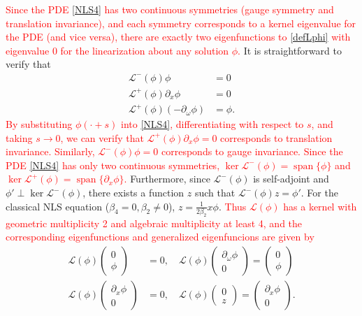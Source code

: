 \documentclass[12pt]{elsarticle}
\def\calL{{\mathcal L}}
\DeclareMathOperator{\spn}{span}
\newcommand{\revised}[1]{ \textcolor{red}{#1} }
\begin{document}
\revised{Since the PDE \cref{NLS4} has two continuous symmetries (gauge symmetry and translation invariance), and each symmetry corresponds to a kernel eigenvalue for the PDE (and vice versa),  there are exactly two eigenfunctions to \cref{defLphi} with eigenvalue 0 for the linearization about any solution $\phi$.} It is straightforward to verify that 
\begin{equation}\label{kerLpmrelations}
\begin{aligned}
\calL^-(\phi) \phi &= 0 \\
\calL^+(\phi) \partial_x \phi &= 0 \\
\calL^+(\phi)(-\partial_\omega \phi) &= \phi.
\end{aligned}
\end{equation}
\revised{By substituting $\phi(\cdot + s)$ into \cref{NLS4}, differentiating with respect to $s$, and taking $s \rightarrow 0$, we can verify that $\calL^+(\phi) \partial_x \phi = 0$ corresponds to translation invariance. Similarly, $\calL^-(\phi) \phi = 0$ corresponds to gauge invariance. Since the PDE \cref{NLS4} has only two continuous symmetries, $\ker \calL^-(\phi) = \spn\{\phi\}$ and $\ker \calL^+(\phi) = \spn\{\partial_x \phi\}$.} Furthermore, since $\calL^-(\phi)$ is self-adjoint and $\phi' \perp \ker \calL^-(\phi)$, there exists a function $z$ such that $\calL^-(\phi) z = \phi'$. For the classical NLS equation ($\beta_4 = 0, \beta_2 \neq 0$), $z = \frac{1}{2 \beta_2} x \phi$. \revised{Thus $\calL(\phi)$ has a kernel with geometric multiplicity 2 and algebraic multiplicity at least 4, and the corresponding eigenfunctions and generalized eigenfuncions are given by}
\begin{equation}\label{Lphikernel}
\begin{aligned}
\calL(\phi)\begin{pmatrix}0 \\ \phi \end{pmatrix} &= 0, \quad
\calL(\phi)\begin{pmatrix} \partial_\omega \phi \\ 0 \end{pmatrix} = \begin{pmatrix}0 \\ \phi \end{pmatrix} \\
\calL(\phi)\begin{pmatrix}\partial_x\phi \\ 0 \end{pmatrix} &= 0, \quad
\calL(\phi)\begin{pmatrix} 0 \\ z \end{pmatrix} = \begin{pmatrix}\partial_x\phi \\ 0 \end{pmatrix}.
\end{aligned}
\end{equation}
\end{document}
